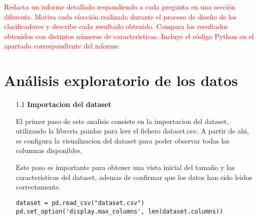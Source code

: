 \documentclass{article}
\begin{document}
\bigskip

\noindent
\textcolor{red}{
Redacta un informe detallado respondiendo a cada pregunta en una secci\'on diferente. Motiva cada elecci\'on realizada durante el proceso de dise\~no de los clasificadores y describe cada resultado obtenido. Compara los resultados obtenidos con distintos n\'umeros de caracter\'{\i}sticas. Incluye el c\'odigo Python en el apartado correspondiente del informe. 
} 


\newpage

\section[1]{An\'alisis exploratorio de los datos}

\begin{itemize}

\item[1.1]  {\bf Importacion del dataset}

El primer paso de este analisis consiste en la importacion del dataset, utilizando la libreria pandas para leer el fichero dataset.csv. A partir de ahi, se configura la visualizacion del dataset para poder observar todas las columnas disponibles.

Este paso es importante para obtener una vista inicial del tamaño y las caracteristicas del dataset, ademas de confirmar que los datos han sido leidos correctamente.

\begin{tcolorbox}[width=14cm]
\begin{scriptsize}
\begin{verbatim}
dataset = pd.read_csv("dataset.csv")
pd.set_option('display.max_columns', len(dataset.columns))
\end{verbatim}
\end{scriptsize}
\end{tcolorbox}

\end{itemize}

\bigskip
\end{document}

